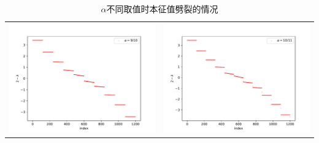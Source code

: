 \documentclass[a4paper,zihao=5,UTF8]{ctexart}
\begin{document}
\begin{table}[htbp]
\begin{tabular}[htbp]{cc}
			\includegraphics[scale=0.5]{5_alpha_9_10.pdf} & \includegraphics[scale=0.5]{5_alpha_10_11.pdf}\\
		\end{tabular}
		\caption{$\alpha$不同取值时本征值劈裂的情况}
		\label{diff alpha}
	\end{table}
\end{document}
